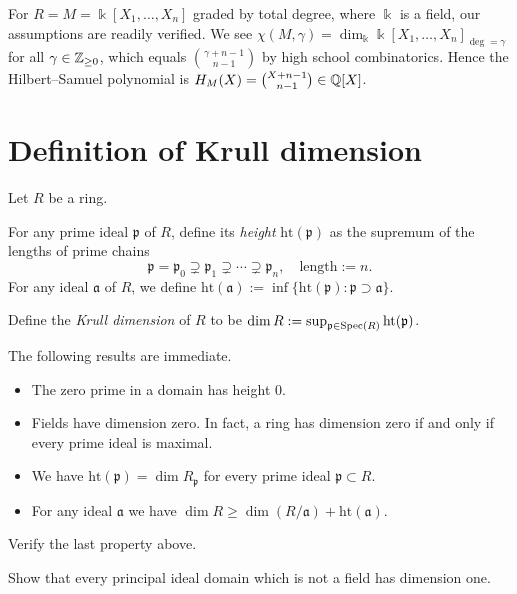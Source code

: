 \begin{example}\label{eg:count-monomials}
	For $R = M = \Bbbk[X_1, \ldots, X_n]$ graded by total degree, where $\Bbbk$ is a field, our assumptions are readily verified. We see $\chi(M, \gamma) = \dim_{\Bbbk} \Bbbk[X_1, \ldots, X_n]_{\deg=\gamma}$ for all $\gamma \in \mathbb{Z}_{\geq 0}$, which equals $\binom{\gamma + n - 1}{n- 1}$ by high school combinatorics. Hence the Hilbert--Samuel polynomial is $H_M(X) = \binom{X+n-1}{n-1} \in \mathbb{Q}[X]$.
\end{example}

\section{Definition of Krull dimension}\label{sec:Krull-dimension}
Let $R$ be a ring.

\begin{definition}\label{def:height-dimension}
	For any prime ideal $\mathfrak{p}$ of $R$, define its \emph{height} $\text{ht}(\mathfrak{p})$ as the supremum of the lengths of prime chains
	\[ \mathfrak{p} = \mathfrak{p}_0 \supsetneq \mathfrak{p}_1 \supsetneq \cdots \supsetneq \mathfrak{p}_n, \quad \text{length} := n. \]
	For any ideal $\mathfrak{a}$ of $R$, we define $\text{ht}(\mathfrak{a}) := \inf\{ \text{ht}(\mathfrak{p}) : \mathfrak{p} \supset \mathfrak{a} \}$.
	
	Define the \emph{Krull dimension} of $R$ to be $\dim R := \sup_{\mathfrak{p} \in \operatorname{Spec}(R)} \text{ht}(\mathfrak{p})$.
\end{definition}

The following results are immediate.
\begin{itemize}
	\item The zero prime in a domain has height $0$.
	\item Fields have dimension zero. In fact, a ring has dimension zero if and only if every prime ideal is maximal.
	\item We have $\text{ht}(\mathfrak{p}) = \dim R_{\mathfrak{p}}$ for every prime ideal $\mathfrak{p} \subset R$.
	\item For any ideal $\mathfrak{a}$ we have $\dim R \geq \dim(R/\mathfrak{a}) + \text{ht}(\mathfrak{a})$.
\end{itemize}

\begin{exercise}
	Verify the last property above.
\end{exercise}

\begin{exercise}
	Show that every principal ideal domain which is not a field has dimension one.
\end{exercise}

